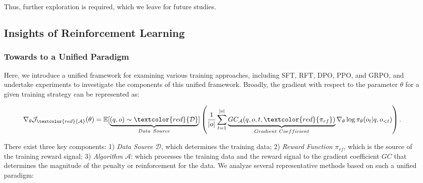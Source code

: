\begin{itemize}[topsep=0pt]
\begin{itemize}[topsep=0pt]
Thus, further exploration is required, which we leave for future studies.

\subsection{Insights of Reinforcement Learning}
\subsubsection{Towards to a Unified Paradigm} Here, we introduce a unified framework for examining various training approaches, including SFT, RFT, DPO, PPO, and GRPO, and undertake experiments to investigate the components of this unified framework. Broadly, the gradient with respect to the parameter $\theta$ for a given training strategy can be represented as:

\begin{equation}
    \nabla_{\theta}\mathcal{J}_{\textcolor{red}{\mathcal{A}}}(\theta) = \mathbb{E}[\underbrace{(q,o) \sim \textcolor{red}{\mathcal{D}}}_{Data \ Source}]\left( \frac{1}{|o|} \sum_{t=1}^{|o|}  \underbrace{GC_{{\mathcal{A}}}(q, o, t, \textcolor{red}{\pi_{{rf}}})}_{Gradient \ Coefficient}  \nabla_{\theta}\log \pi_{\theta}(o_t | q, o_{<t})\right).
\label{eq:objective}
\end{equation}

There exist three key components: 1) \textit{Data Source $\mathcal{D}$}, which determines the training data; 2) \textit{Reward Function $\pi_{{rf}}$}, which is the source of the training reward signal; 3) \textit{Algorithm $\mathcal{A}$}: which processes the training data and the reward signal to the gradient coefficient $GC$ that determines the magnitude of the penalty or reinforcement for the data. We analyze several representative methods based on such a unified paradigm:


\end{itemize}
\end{itemize}
